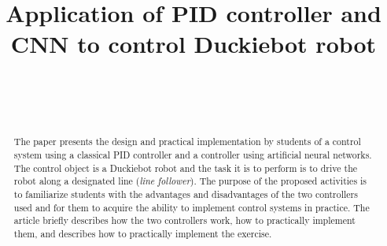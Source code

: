 \documentclass[conference]{IEEEtran}
\begin{document}
%
\title{Application of PID controller and CNN to control Duckiebot robot}


\author{
\\[0.4cm]
\and
{}
\\
}


\maketitle              %

\begin{abstract}
The paper presents the design and practical implementation by students of a control system
using a classical PID controller and a controller using artificial neural networks.
The control object is a Duckiebot robot and the task it is to perform is to drive the robot along a designated line (\emph{line follower}). The purpose of the proposed activities is to familiarize students with the advantages and disadvantages of the two controllers used and for them to acquire the ability to implement control systems in practice. 
The article briefly describes how the two controllers work, how to practically implement them, and describes how to practically implement the exercise. 
\end{abstract}
\end{document}
